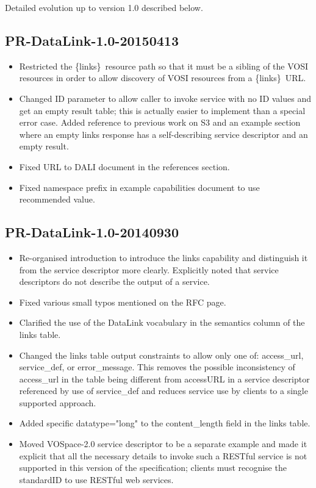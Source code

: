 \documentclass[11pt,a4paper]{ivoa}
\newcommand{\blinks}{\{links\}}
\newcommand{\attval}[2]{#1={\allowbreak}{"}#2{"}}
\begin{document}
Detailed evolution up to version 1.0 described below.

\subsection{PR-DataLink-1.0-20150413}

\begin{itemize}
\item
Restricted the \blinks\ resource path so that it must be a sibling of
the VOSI resources in order to allow discovery of VOSI resources from
a \blinks\ URL.
\item
Changed ID parameter to allow caller to invoke service with no ID values
and get an empty result table; this is actually easier to implement
than a special error case. Added reference to previous work on S3 and
an example section where an empty links response has a self-describing
service descriptor and an empty result.
\item
Fixed URL to DALI document in the references section.
\item
Fixed namespace prefix in example capabilities document to use recommended
value.
\end{itemize}


\subsection{PR-DataLink-1.0-20140930}

\begin{itemize}
\item
Re-organised introduction to introduce the links capability and
distinguish it from the service descriptor more clearly. Explicitly
noted that service descriptors do not describe the output of a service.
\item
Fixed various small typos mentioned on the RFC page.
\item
Clarified the use of the DataLink vocabulary in the semantics column of
the links table.
\item
Changed the links table output constraints to allow only one of:
access\_url, service\_def, or error\_message. This removes the possible
inconsistency of access\_url in the table being different from accessURL
in a service descriptor referenced by use of service\_def and reduces
service use by clients to a single supported approach.
\item
Added specific \attval{datatype}{long} to the content\_length field in the
links table.
\item
Moved VOSpace-2.0 service descriptor to be a separate example and made
it explicit that all the necessary details to invoke such a RESTful
service is not supported in this version of the specification; clients
must recognise the standardID to use RESTful web services.
\end{itemize}
\end{document}
